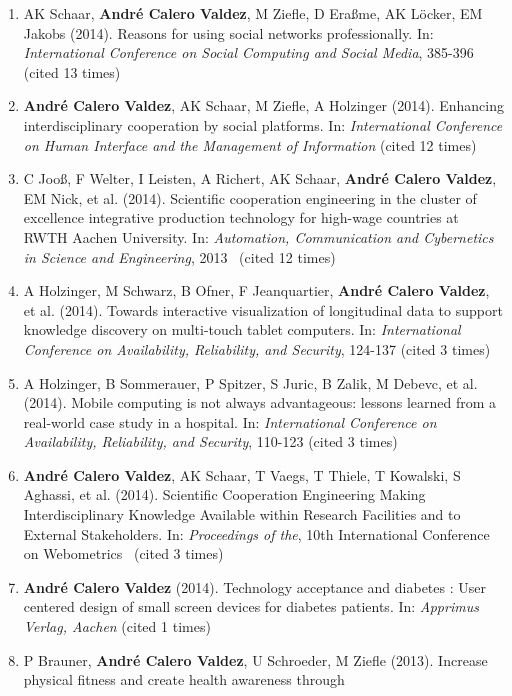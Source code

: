 \documentclass[11pt,a4paper,sans]{moderncv}
\begin{document}
\begin{enumerate}
{  in the Ergonomics in Manufacturing: Managing the enterprise of the
  Future} (cited 16 times)
\item
  AK Schaar, \textbf{André Calero Valdez}, M Ziefle, D Eraßme, AK
  Löcker, EM Jakobs (2014). Reasons for using social networks
  professionally. In: \emph{International Conference on Social Computing
  and Social Media}, 385-396 (cited 13 times)
\item
  \textbf{André Calero Valdez}, AK Schaar, M Ziefle, A Holzinger (2014).
  Enhancing interdisciplinary cooperation by social platforms. In:
  \emph{International Conference on Human Interface and the Management
  of Information} (cited 12 times)
\item
  C Jooß, F Welter, I Leisten, A Richert, AK Schaar, \textbf{André
  Calero Valdez}, EM Nick, et al. (2014). Scientific cooperation
  engineering in the cluster of excellence integrative production
  technology for high-wage countries at RWTH Aachen University. In:
  \emph{Automation, Communication and Cybernetics in Science and
  Engineering}, 2013~ (cited 12 times)
\item
  A Holzinger, M Schwarz, B Ofner, F Jeanquartier, \textbf{André Calero
  Valdez}, et al. (2014). Towards interactive visualization of
  longitudinal data to support knowledge discovery on multi-touch tablet
  computers. In: \emph{International Conference on Availability,
  Reliability, and Security}, 124-137 (cited 3 times)
\item
  A Holzinger, B Sommerauer, P Spitzer, S Juric, B Zalik, M Debevc, et
  al. (2014). Mobile computing is not always advantageous: lessons
  learned from a real-world case study in a hospital. In:
  \emph{International Conference on Availability, Reliability, and
  Security}, 110-123 (cited 3 times)
\item
  \textbf{André Calero Valdez}, AK Schaar, T Vaegs, T Thiele, T
  Kowalski, S Aghassi, et al. (2014). Scientific Cooperation Engineering
  Making Interdisciplinary Knowledge Available within Research
  Facilities and to External Stakeholders. In: \emph{Proceedings of
  the}, 10th International Conference on Webometrics~ (cited 3 times)
\item
  \textbf{André Calero Valdez} (2014). Technology acceptance and
  diabetes : User centered design of small screen devices for diabetes
  patients. In: \emph{Apprimus Verlag, Aachen} (cited 1 times)
\item
  P Brauner, \textbf{André Calero Valdez}, U Schroeder, M Ziefle (2013).
  Increase physical fitness and create health awareness through

\end{enumerate}
\end{document}
